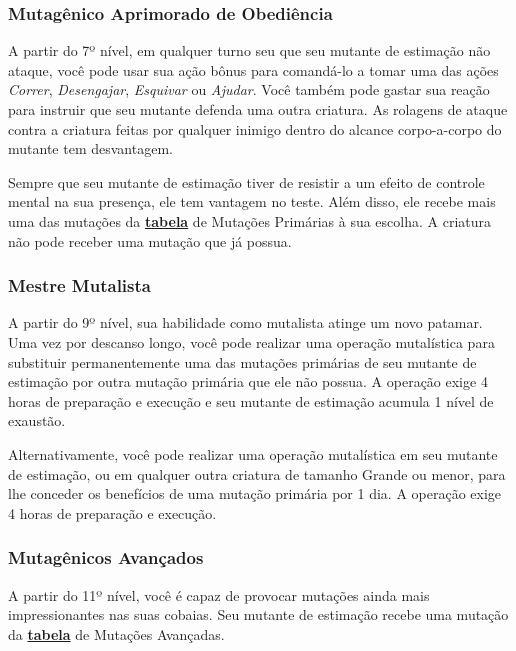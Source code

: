 \documentclass[letterpaper,twocolumn,openany]{dndbook}
\begin{document}
	\subsubsection{Mutagênico Aprimorado de Obediência}
	A partir do 7º nível, em qualquer turno seu que seu mutante de estimação não ataque, você pode usar sua ação bônus para comandá-lo a tomar uma das ações \textit{Correr}, \textit{Desengajar}, \textit{Esquivar} ou \textit{Ajudar}.
	Você também pode gastar sua reação para instruir que seu mutante defenda uma outra criatura. As rolagens de ataque contra a criatura feitas por qualquer inimigo dentro do alcance corpo-a-corpo do mutante tem desvantagem.
	\par Sempre que seu mutante de estimação tiver de resistir a um efeito de controle mental na sua presença, ele tem vantagem no teste. Além disso, ele recebe mais uma das mutações da \hyperref[tab:mutacoes_primarias]{\textbf{tabela}} de Mutações Primárias à sua escolha. A criatura não pode receber uma mutação que já possua.
	
	\subsubsection{Mestre Mutalista}
	A partir do 9º nível, sua habilidade como mutalista atinge um novo patamar.
	Uma vez por descanso longo, você pode realizar uma operação mutalística para substituir permanentemente uma das mutações primárias de seu mutante de estimação por outra mutação primária que ele não possua. A operação exige 4 horas de preparação e execução e seu mutante de estimação acumula 1 nível de exaustão.
	\par Alternativamente, você pode realizar uma operação mutalística em seu mutante de estimação, ou em qualquer outra criatura de tamanho Grande ou menor, para lhe conceder os benefícios de uma mutação primária por 1 dia. A operação exige 4 horas de preparação e execução.
	
	
	\subsubsection{Mutagênicos Avançados}
	A partir do 11º nível, você é capaz de provocar mutações ainda mais impressionantes nas suas cobaias. Seu mutante de estimação recebe uma mutação da \hyperref[tab:mutacoes_avancadas]{\textbf{tabela}} de Mutações Avançadas.
	
\end{document}
